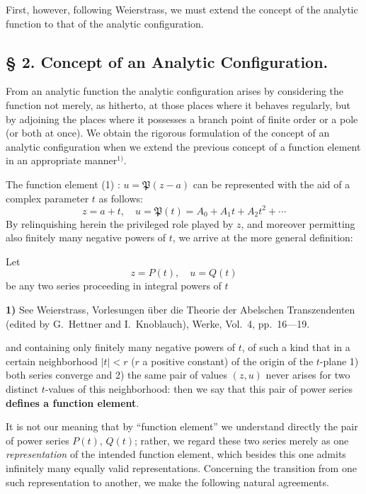 \documentclass{article}
\begin{document}
First, however, following Weierstrass, we must extend the concept of the analytic function to that of the analytic configuration.

\subsection*{§ 2. Concept of an Analytic Configuration.}

From an analytic function the analytic configuration arises by considering the function not merely, as hitherto, at those places where it behaves regularly, but by adjoining the places where it possesses a branch point of finite order or a pole (or both at once). We obtain the rigorous formulation of the concept of an analytic configuration when we extend the previous concept of a function element in an appropriate manner${}^{1)}$.

The function element (1) : $u = \mathfrak{P}(z - a)$ can be represented with the aid of a complex parameter $t$ as follows:
\[ z = a + t, \quad u = \mathfrak{P}(t) = A_0 + A_1 t + A_2 t^2 + \cdots \]
By relinquishing herein the privileged role played by $z$, and moreover permitting also finitely many negative powers of $t$, we arrive at the more general definition:

Let
\[ z = P(t), \quad u = Q(t) \]
be any two series proceeding in integral powers of $t$

\textbf{1)} See Weierstrass, Vorlesungen über die Theorie der Abelschen Transzendenten (edited by G.~Hettner and I.~Knoblauch), Werke, Vol.~4, pp.~16---19.

and containing only finitely many negative powers of $t$, of such a kind that in a certain neighborhood $|t| < r$ ($r$ a positive constant) of the origin of the $t$-plane 1) both series converge and 2) the same pair of values $(z, u)$ never arises for two distinct $t$-values of this neighborhood: then we say that this pair of power series \textbf{defines a function element}.

It is not our meaning that by ``function element'' we understand directly the pair of power series $P(t)$, $Q(t)$; rather, we regard these two series merely as one \emph{representation} of the intended function element, which besides this one admits infinitely many equally valid representations. Concerning the transition from one such representation to another, we make the following natural agreements.
\end{document}
